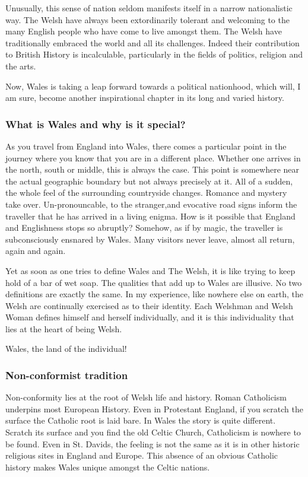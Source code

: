 \documentclass{article}
\begin{document}
Unusually, this sense of nation seldom manifests itself in a narrow nationalistic way.
The Welsh have always been extordinarily tolerant and welcoming to the many English people who have come to live amongst them.
The Welsh have traditionally embraced the world and all its challenges.
Indeed their contribution to British History is incalculable, particularly in the fields of politics, religion and the arts.

Now, Wales is taking a leap forward towards a political nationhood, which will, I am sure, become another inspirational chapter in its long and varied history.

\subsubsection{What is Wales and why is it special?}
As you travel from England into Wales, there comes a particular point in the journey where you know that you are in a different place.
Whether one arrives in the north, south or middle, this is always the case.
This point is somewhere near the actual geographic boundary but not always precisely at it.
All of a sudden, the whole feel of the surrounding countryside changes.
Romance and mystery take over.
Un-pronouncable, to the stranger,and evocative road signs inform the traveller that he has arrived in a living enigma.
How is it possible that England and Englishness stops so abruptly?
Somehow, as if by magic, the traveller is subconsciously ensnared by Wales.
Many visitors never leave, almost all return, again and again.

Yet as soon as one tries to define Wales and The Welsh, it is like trying to keep hold of a bar of wet soap.
The qualities that add up to Wales are illusive.
No two definitions are exactly the same.
In my experience, like nowhere else on earth, the Welsh are continually exercised as to their identity.
Each Welshman and Welsh Woman defines himself and herself individually, and it is this individuality that lies at the heart of  being Welsh.

Wales, the land of the individual!

\subsubsection{Non-conformist tradition}
Non-conformity lies at the root of Welsh life and history.
Roman Catholicism underpins most European History.
Even in Protestant England, if you scratch the surface the Catholic root is laid bare.
In Wales the story is quite different.
Scratch its surface and you find the old Celtic Church, Catholicism is nowhere to be found.
Even in St. Davids, the feeling is not the same as it is in other historic religious sites in England and Europe.
This absence of an obvious Catholic history makes Wales unique amongst the Celtic nations.
\end{document}
